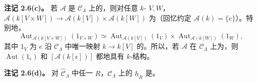 \textbf{注记 2.6(c)。} 若 $\mathcal A$ 是 $\mathcal C_\Lambda$ 上的，则对任意 $k$- $V,W$，
$\mathcal A(k[V\times W])\to\mathcal A(k[V])\times\mathcal A(k[W])$ 为（回忆约定 $\mathcal A(k)=\{e\}$）。特别地，
\[\operatorname{Aut}_{\mathcal A(k[V\times W])}(1_{V\times W})\simeq
\operatorname{Aut}_{\mathcal A(k[V])}(1_V)\times\operatorname{Aut}_{\mathcal A(k[W])}(1_W),\]
其中 $1_V$ 为 $e$ 沿 $\mathcal C_\Lambda$ 中唯一映射 $k\to k[V]$ 的。所以，若 $\mathcal A$ 在 $\mathcal C_\Lambda$ 上为，则 $\operatorname{Aut}(1_\epsilon)$ 和 $[\mathcal A(k[\epsilon])]$ 都地具有 $k$-结构。

\textbf{注记 2.6(d)。} 对 $\widehat{\mathcal C}_\Lambda$ 中任一 $R$，$\mathcal C_\Lambda$ 上的 $\underline h_R$ 是。


